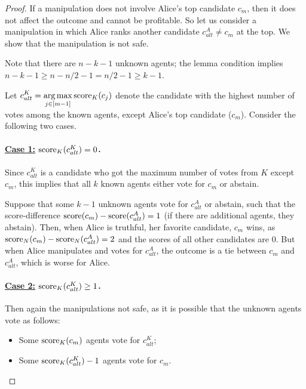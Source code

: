 \begin{proof}

\newcommand{\aFav}{c_m}
\newcommand{\aAlt}{c^A_{alt}}
\newcommand{\kAlt}{c^K_{alt}}

If a manipulation does not involve Alice's top candidate $c_m$, then it does not affect the outcome and cannot be profitable. So let us consider a manipulation in which Alice ranks another candidate $\aAlt\neq c_m$ at the top. We show that the manipulation is not safe.

Note that there are $n-k-1$ unknown agents; the lemma condition implies $n-k-1\geq n-n/2-1 = n/2-1 \geq k-1$.

Let $\displaystyle \kAlt = \argmax_{j \in [m-1]} \score_K(c_j)$ denote the candidate with the highest number of votes among the known agents, except Alice's top candidate ($c_m$).
Consider the following two cases.

\paragraph{\underline{Case 1:} $\score_K(\kAlt) = 0$.} Since $\kAlt$ is a candidate who got the maximum number of votes from $K$ except $\aFav$, this implies that all $k$ known agents either vote for $\aFav$ or abstain.

Suppose that some $k-1$ unknown agents vote for $\aAlt$ or abstain, such that the score-difference $\score(c_m)-\score(\aAlt) = 1$ (if there are additional agents, they abstain).
Then, when Alice is truthful, her favorite candidate, $\aFav$ wins, as $\score_N(c_m) -\score_N(\aAlt) = 2$ and the scores of all other candidates are $0$. 
But when Alice manipulates and votes for $\aAlt$, the outcome is a tie between $\aFav$ and $\aAlt$, which is worse for Alice.



\paragraph{\underline{Case 2:} $\score_K(\kAlt) \geq 1$.}
Then again the manipulations not safe, as it is possible that the unknown agents vote as follows: 
\begin{itemize}
\item Some $\score_K(\aFav)$ agents vote for $\kAlt$;
\item Some 
$\score_K(\kAlt) -1$ agents vote for $c_m$. 


\end{itemize}
\end{proof}
